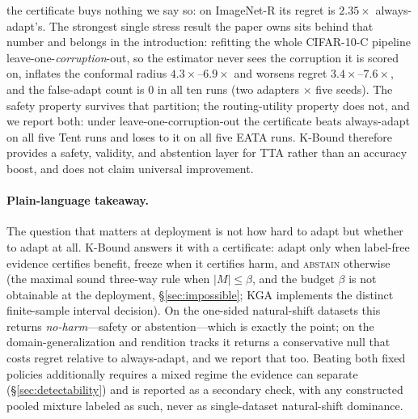 the certificate buys nothing we say so: on ImageNet-R its regret is $2.35\times$ always-adapt's.
The strongest single stress result the paper owns sits behind that number and belongs in the
introduction: refitting the whole CIFAR-10-C pipeline leave-one-\emph{corruption}-out, so the
estimator never sees the corruption it is scored on, inflates the conformal radius
$4.3\times$--$6.9\times$ and worsens regret $3.4\times$--$7.6\times$, and the false-adapt count is
$0$ in all ten runs (two adapters $\times$ five seeds). The safety property survives that partition;
the routing-utility property does not, and we report both: under leave-one-corruption-out the
certificate beats always-adapt on all five Tent runs and loses to it on all five EATA runs.
K-Bound therefore provides a safety, validity, and abstention layer for TTA rather than an accuracy
boost, and does not claim universal improvement.

\paragraph{Plain-language takeaway.}
The question that matters at deployment is not how hard to adapt but whether to adapt at all. K-Bound
answers it with a certificate: adapt only when label-free evidence certifies benefit, freeze when it
certifies harm, and \textsc{abstain} otherwise (the maximal sound three-way rule when
$|M|\le\beta$, and the budget $\beta$ is not obtainable at the deployment,
\S\ref{sec:impossible}; KGA implements the distinct finite-sample interval decision). On the one-sided natural-shift
datasets this returns \emph{no-harm}---safety or abstention---which is exactly the point; on the
domain-generalization and rendition tracks it returns a conservative null that costs regret relative
to always-adapt, and we report that too. Beating both fixed policies additionally requires a mixed
regime the evidence can separate (\S\ref{sec:detectability}) and is reported as a secondary check,
with any constructed pooled mixture labeled as such, never as single-dataset natural-shift dominance.

